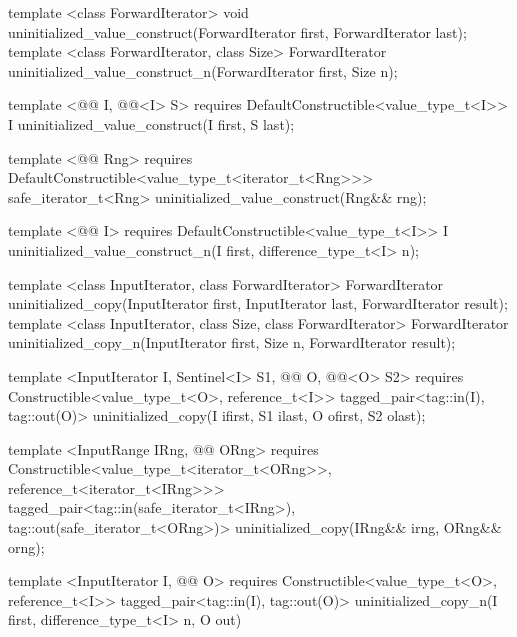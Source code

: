 {\color{remclr}
\begin{codeblock}
template <class ForwardIterator>
  void uninitialized_value_construct(ForwardIterator first, ForwardIterator last);
template <class ForwardIterator, class Size>
  ForwardIterator uninitialized_value_construct_n(ForwardIterator first, Size n);
\end{codeblock}
} %
{\color{addclr}
\begin{codeblock}
template <@@ I, @@<I> S>
  requires
DefaultConstructible<value_type_t<I>>
  I uninitialized_value_construct(I first, S last);

template <@@ Rng>
  requires
DefaultConstructible<value_type_t<iterator_t<Rng>>>
  safe_iterator_t<Rng> uninitialized_value_construct(Rng&& rng);

template <@@ I>
  requires
DefaultConstructible<value_type_t<I>>
  I uninitialized_value_construct_n(I first, difference_type_t<I> n);
\end{codeblock}
} %

{\color{remclr}
\begin{codeblock}
template <class InputIterator, class ForwardIterator>
  ForwardIterator uninitialized_copy(InputIterator first, InputIterator last,
                                     ForwardIterator result);
template <class InputIterator, class Size, class ForwardIterator>
  ForwardIterator uninitialized_copy_n(InputIterator first, Size n,
                                       ForwardIterator result);
\end{codeblock}
} %
{\color{addclr}
\begin{codeblock}
template <InputIterator I, Sentinel<I> S1, @@ O, @@<O> S2>
  requires
Constructible<value_type_t<O>, reference_t<I>>
  tagged_pair<tag::in(I), tag::out(O)>
uninitialized_copy(I ifirst, S1 ilast, O ofirst, S2 olast);

template <InputRange IRng, @@ ORng>
  requires
Constructible<value_type_t<iterator_t<ORng>>, reference_t<iterator_t<IRng>>>
  tagged_pair<tag::in(safe_iterator_t<IRng>), tag::out(safe_iterator_t<ORng>)>
uninitialized_copy(IRng&& irng, ORng&& orng);

template <InputIterator I, @@ O>
  requires
Constructible<value_type_t<O>, reference_t<I>>
  tagged_pair<tag::in(I), tag::out(O)>
uninitialized_copy_n(I first, difference_type_t<I> n, O out)
\end{codeblock}
} %

